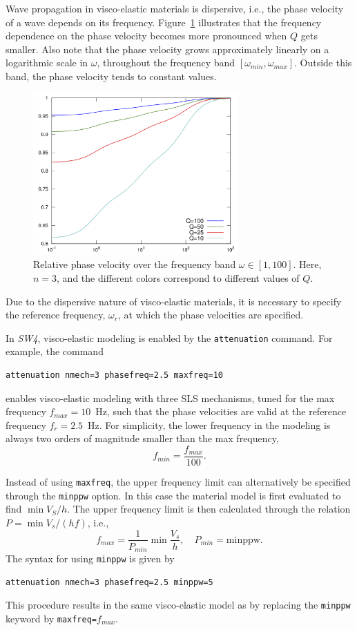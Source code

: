 \documentclass[11pt]{report}
\begin{document}
Wave propagation in visco-elastic materials is dispersive, i.e., the phase velocity of a wave
depends on its frequency. Figure~\ref{fig:phase-velo} illustrates that the frequency dependence on
the phase velocity becomes more pronounced when $Q$ gets smaller. Also note that the phase velocity
grows approximately linearly on a logarithmic scale in $\omega$, throughout the frequency band
$[\omega_{min},\omega_{max}]$. Outside this band, the phase velocity tends to constant values.
\begin{figure}
\begin{centering}
\includegraphics[width=0.7\textwidth]{figures/phase-velo2.png}
\caption{Relative phase velocity over the frequency band
  $\omega\in[1,100]$. Here, $n=3$, and the different colors correspond to different values of $Q$.}
\label{fig:phase-velo}
\end{centering}
\end{figure}
Due to the dispersive nature of visco-elastic materials, it is necessary to specify the reference
frequency, $\omega_r$, at which the phase velocities are specified.

In \emph{SW4}, visco-elastic modeling is enabled by the {\tt attenuation} command. For example, the
command
\begin{verbatim}
attenuation nmech=3 phasefreq=2.5 maxfreq=10
\end{verbatim}
enables visco-elastic modeling with three SLS mechanisms, tuned for the max frequency
$f_{max}=10$~Hz, such that the phase velocities are valid at the reference frequency
$f_r=2.5$~Hz. For simplicity, the lower frequency in the modeling is always two orders of
magnitude smaller than the max frequency,
\[
f_{min}=\frac{f_{max}}{100}.
\]

Instead of using \verb+maxfreq+, the upper frequency limit can alternatively be specified through the
\verb+minppw+ option. In this case the material model is first evaluated to find $\min V_S/h$. The
upper frequency limit is then calculated through the relation $P=\min V_s/(h
f)$, i.e.,
\[
f_{max} = \frac{1}{P_{min}}\min \frac{V_s}{h},\quad P_{min}=\mbox{minppw}.
\]
The syntax for using \verb+minppw+ is given by
\begin{verbatim}
attenuation nmech=3 phasefreq=2.5 minppw=5
\end{verbatim}
This procedure results in the same visco-elastic model as by replacing the \verb+minppw+ keyword by \verb+maxfreq=+$f_{max}$.
\end{document}
